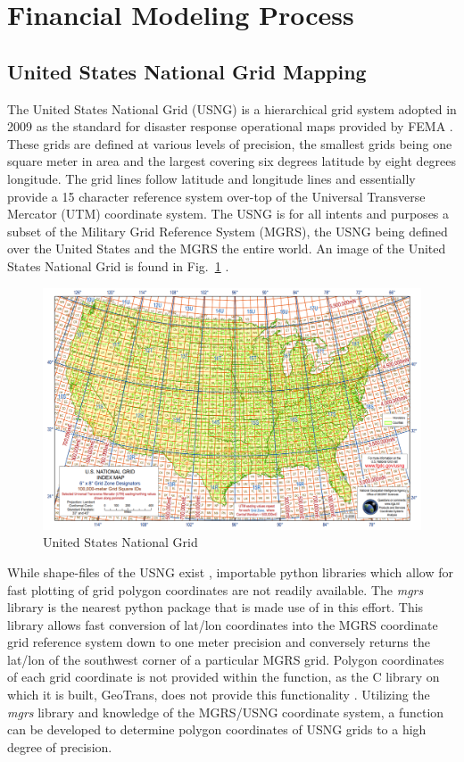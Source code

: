 \documentclass[conference]{IEEEtran}
\begin{document}
\section{Financial Modeling Process}

\subsection{United States National Grid Mapping}
The United States National Grid (USNG) is a hierarchical grid system adopted in 2009 as the standard for disaster response operational maps provided by FEMA \cite{a10}. These grids are defined at various levels of precision, the smallest grids being one square meter in area and the largest covering six degrees latitude by eight degrees longitude. The grid lines follow latitude and longitude lines and essentially provide a 15 character reference system over-top of the Universal Transverse Mercator (UTM) coordinate system. The USNG is for all intents and purposes a subset of the Military Grid Reference System (MGRS), the USNG being defined over the United States and the MGRS the entire world. An image of the United States National Grid is found in Fig.~\ref{usngmap} \cite{a10}.

\begin{figure}[h]
\centering\includegraphics[width=1\linewidth]{USNG.png}
\caption{United States National Grid}
\label{usngmap}
\end{figure}

While shape-files of the USNG exist \cite{a11}, importable python libraries which allow for fast plotting of grid polygon coordinates are not readily available. The \emph{mgrs} library is the nearest python package \cite{a12} that is made use of in this effort. This library allows fast conversion of lat/lon coordinates into the MGRS coordinate grid reference system down to one meter precision and conversely returns the lat/lon of the southwest corner of a particular MGRS grid. Polygon coordinates of each grid coordinate is not provided within the function, as the C library on which it is built, GeoTrans, does not provide this functionality \cite{a13}. Utilizing the \emph{mgrs} library and knowledge of the MGRS/USNG coordinate system, a function can be developed to determine polygon coordinates of USNG grids to a high degree of precision. 
\end{document}
